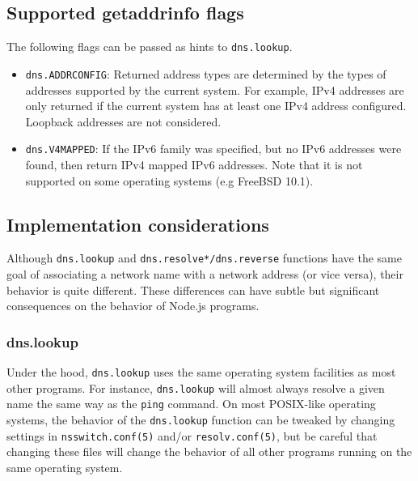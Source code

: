 \subsection{Supported getaddrinfo
flags}\label{supported-getaddrinfo-flags}

The following flags can be passed as hints to \texttt{dns.lookup}.

\begin{itemize}
\itemsep1pt\parskip0pt
\item
  \texttt{dns.ADDRCONFIG}: Returned address types are determined by the
  types of addresses supported by the current system. For example, IPv4
  addresses are only returned if the current system has at least one
  IPv4 address configured. Loopback addresses are not considered.
\item
  \texttt{dns.V4MAPPED}: If the IPv6 family was specified, but no IPv6
  addresses were found, then return IPv4 mapped IPv6 addresses. Note
  that it is not supported on some operating systems (e.g FreeBSD 10.1).
\end{itemize}

\subsection{Implementation
considerations}\label{implementation-considerations}

Although \texttt{dns.lookup} and \texttt{dns.resolve*/dns.reverse}
functions have the same goal of associating a network name with a
network address (or vice versa), their behavior is quite different.
These differences can have subtle but significant consequences on the
behavior of Node.js programs.

\subsubsection{dns.lookup}\label{dns.lookup}

Under the hood, \texttt{dns.lookup} uses the same operating system
facilities as most other programs. For instance, \texttt{dns.lookup}
will almost always resolve a given name the same way as the
\texttt{ping} command. On most POSIX-like operating systems, the
behavior of the \texttt{dns.lookup} function can be tweaked by changing
settings in \texttt{nsswitch.conf(5)} and/or \texttt{resolv.conf(5)},
but be careful that changing these files will change the behavior of all
other programs running on the same operating system.

